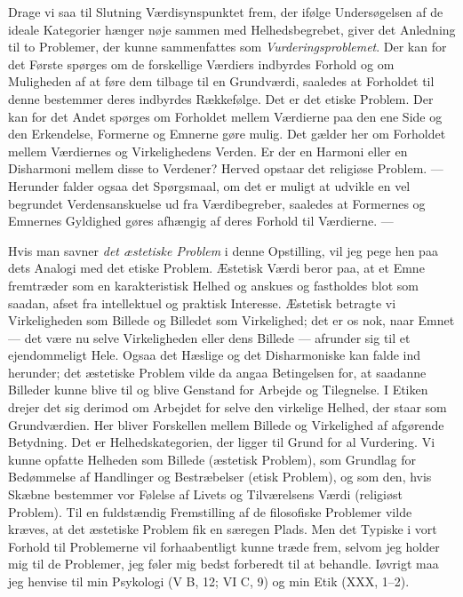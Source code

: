 \documentclass[12pt,a4paper]{book}
\newcommand{\apage}[1]{\marginnote{\footnotesize\textit{[#1]}}}
\begin{document}
\apage{250} Drage vi saa til Slutning Værdisynspunktet frem, der ifølge Undersøgelsen af de
ideale Kategorier hænger nøje sammen med Helhedsbegrebet, giver det Anledning til
to Problemer, der kunne sammenfattes som \emph{Vurderingsproblemet}. Der kan for
det Første spørges om de forskellige Værdiers indbyrdes Forhold og om Muligheden af
at føre dem tilbage til en Grundværdi, saaledes at Forholdet til denne bestemmer
deres indbyrdes Rækkefølge. Det er det etiske Problem. Der kan for det Andet
spørges om Forholdet mellem Værdierne paa den ene Side og den Erkendelse, Formerne
og Emnerne gøre mulig. Det gælder her om Forholdet mellem Værdiernes og
Virkelighedens Verden. Er der en Harmoni eller en Disharmoni mellem disse to
Verdener? Herved opstaar det religiøse Problem. --- Herunder falder ogsaa det
Spørgsmaal, om det er muligt at udvikle en vel begrundet Verdensanskuelse ud fra
Værdibegreber, saaledes at Formernes og Emnernes Gyldighed gøres afhængig af deres
Forhold til Værdierne. ---

Hvis man savner \emph{det æstetiske Problem} i denne Opstilling, vil jeg pege hen
paa dets Analogi med det etiske Problem. Æstetisk Værdi beror paa, at et Emne
fremtræder som en karakteristisk Helhed og anskues og fastholdes blot som saadan,
afset fra intellektuel og praktisk Interesse. Æstetisk betragte vi Virkeligheden
som Billede og Billedet som Virkelighed; det er os nok, naar Emnet --- det være nu
selve Virkeligheden eller dens Billede --- afrunder sig til et ejendommeligt Hele.
Ogsaa det Hæslige og det Disharmoniske kan falde ind herunder; det æstetiske
Problem vilde da angaa Betingelsen for, at saadanne Billeder kunne blive til og
blive Genstand for Arbejde og Tilegnelse. I Etiken drejer det sig derimod om
Arbejdet for selve den virkelige Helhed, der staar som Grundværdien. Her bliver
Forskellen mellem Billede og Virkelighed af afgørende Betydning. Det er
Helhedskategorien, der ligger til Grund for al Vurdering. Vi kunne opfatte Helheden
som Billede (æstetisk Problem), som Grundlag for Bedømmelse af Handlinger og
Bestræbelser (etisk Problem), og som den, hvis Skæbne bestemmer \apage{251} vor Følelse af
Livets og Tilværelsens Værdi (religiøst Problem). Til en fuldstændig Fremstilling
af de filosofiske Problemer vilde kræves, at det æstetiske Problem fik en særegen
Plads. Men det Typiske i vort Forhold til Problemerne vil forhaabentligt kunne
træde frem, selvom jeg holder mig til de Problemer, jeg føler mig bedst forberedt
til at behandle. Iøvrigt maa jeg henvise til min Psykologi (V B, 12; VI C, 9) og
min Etik (XXX, 1--2).
\end{document}
